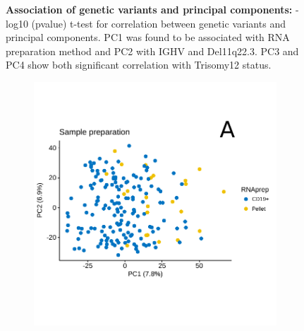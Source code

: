 \begin{figure}
	\centering
	\def\svgwidth{\columnwidth}
	
	\caption{\textbf{Association of genetic variants and principal components:} -log10 (pvalue) t-test for correlation between genetic variants and principal components. PC1 was found to be associated with RNA preparation method and PC2 with IGHV and Del11q22.3. PC3 and PC4 show both significant correlation with Trisomy12 status.}
	\label{fig:corplot_pca_variants}
\end{figure} 

\begin{figure}
	\centering
	\begin{subfigure}[t]{0.45\columnwidth}
		\includegraphics[width=\columnwidth]{./Figures/pca_RNAprep.pdf}
		\subcaption*{}
		\label{fig:pca_RNAprep}
	\end{subfigure}
	\quad
	\begin{subfigure}[t]{0.45\columnwidth}

\end{subfigure}
\end{figure}
